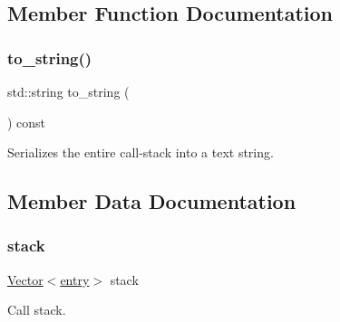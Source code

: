 \subsection{Member Function Documentation}
\mbox{\label{classstacktrace_1_1call__stack_aac993ecccd3d88aafefb6b8e3caa1dee}} 
\subsubsection{\texorpdfstring{to\+\_\+string()}{to\_string()}}
{\footnotesize\ttfamily std\+::string to\+\_\+string (\begin{DoxyParamCaption}{ }\end{DoxyParamCaption}) const\hspace{0.3cm}{\ttfamily [inline]}}



Serializes the entire call-\/stack into a text string. 



\subsection{Member Data Documentation}
\mbox{\label{classstacktrace_1_1call__stack_afb1b12afa5abb9843b1e4136e01fda7a}} 
\subsubsection{\texorpdfstring{stack}{stack}}
{\footnotesize\ttfamily \mbox{\hyperlink{classVector}{Vector}}$<$\mbox{\hyperlink{structstacktrace_1_1entry}{entry}}$>$ stack}



Call stack. 

